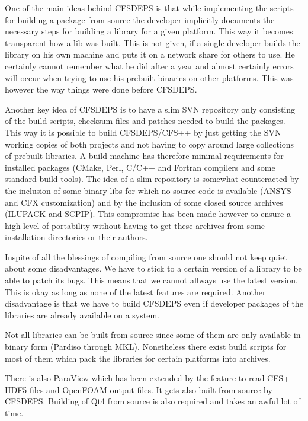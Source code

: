 One of  the main ideas behind  CFSDEPS is that while  implementing the scripts
for  building a  package from  source the  developer implicitly  documents the
necessary  steps for  building a  library for  a given  platform. This  way it
becomes  transparent how a  lib was  built.  This  is not  given, if  a single
developer builds the library on his own machine and puts it on a network share
for others to use.  He certainly cannot  remember what he did after a year and
almost certainly errors will occur when trying to use his prebuilt binaries on
other platforms. This was however the way things were done before CFSDEPS.

Another key idea  of CFSDEPS is to have a slim  SVN repository only consisting
of  the  build  scripts,  checksum  files  and patches  needed  to  build  the
packages. This way  it is possible to build CFSDEPS/CFS++  by just getting the
SVN  working copies  of both  projects  and not  having to  copy around  large
collections  of prebuilt  libraries.  A  build machine  has  therefore minimal
requirements for installed packages  (CMake, Perl, C/C++ and Fortran compilers
and some  standard build  tools). The  idea of a  slim repository  is somewhat
counteracted by the inclusion of some  binary libs for which no source code is
available (ANSYS  and CFX customization) and  by the inclusion  of some closed
source archives (ILUPACK and SCPIP).  This compromise has been made however to
ensure a high  level of portability without having to  get these archives from
some installation directories or their authors.

Inspite of  all the  blessings of  compiling from source  one should  not keep
quiet about  some disadvantages. We  have to stick  to a certain version  of a
library to be  able to patch its  bugs. This means that we  cannot allways use
the latest version.  This is okay as  long as none of the  latest features are
required.  Another disadvantage  is  that we  have  to build  CFSDEPS even  if
developer packages of the libraries are already available on a system.

Not  all libraries  can  be built  from source  since  some of  them are  only
available in binary form (Pardiso  through MKL). Nonetheless there exist build
scripts for most  of them which pack the libraries  for certain platforms into
archives.

There is  also ParaView which has been  extended by the feature  to read CFS++
HDF5  files and  OpenFOAM output  files.  It  gets also  built from  source by
CFSDEPS. Building of  Qt4 from source is also required and  takes an awful lot
of time.

